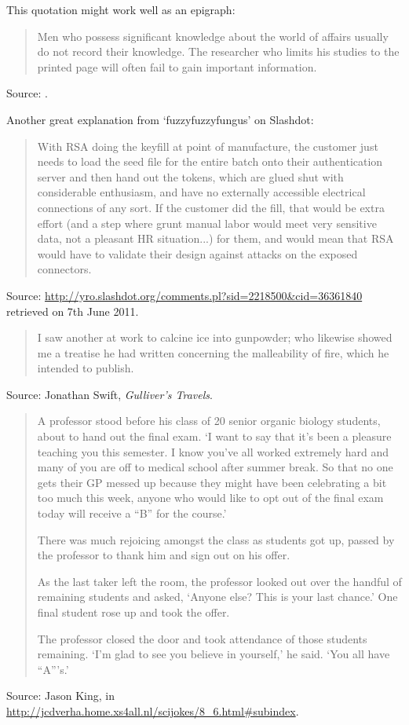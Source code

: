 \documentclass[a4paper]{article}
\begin{document}
This quotation might work well as an epigraph:
\begin{quote}
Men who possess significant knowledge about the world of affairs
usually do not record their knowledge.  The researcher who limits
his studies to the printed page will often fail to gain important
information.
\end{quote}
Source: \citep[p.~ix]{Ginzberg1955}.
\medskip

Another great explanation from `fuzzyfuzzyfungus' on Slashdot:
\begin{quote}
	With RSA doing the keyfill at point of manufacture, the customer just needs to load the seed
file for the entire batch onto their authentication server and then hand out the tokens, which are
glued shut with considerable enthusiasm, and have no externally accessible electrical connections
of any sort. If the customer did the fill, that would be extra effort (and a step where grunt
manual labor would meet very sensitive data, not a pleasant HR situation...) for them, and would
mean that RSA would have to validate their design against attacks on the exposed connectors.
\end{quote}
Source: \url{http://yro.slashdot.org/comments.pl?sid=2218500&cid=36361840} retrieved on 7th June
2011.
\medskip

\begin{quote}
	I saw another at work to calcine ice into gunpowder; who likewise
	showed me a treatise he had written concerning the malleability
	of fire, which he intended to publish.
\end{quote}
Source: Jonathan Swift, \emph{Gulliver's Travels}.
\medskip

\begin{quote}
	A professor stood before his class of 20 senior organic biology
	students, about to hand out the final exam. `I want to say that
	it's been a pleasure teaching you this semester. I know you've
	all worked extremely hard and many of you are off to medical
	school after summer break. So that no one gets their GP messed
	up because they might have been celebrating a bit too much this
	week, anyone who would like to opt out of the final exam today
	will receive a ``B'' for the course.'

	There was much rejoicing amongst the class as students got up,
	passed by the professor to thank him and sign out on his offer.

	As the last taker left the room, the professor looked out over
	the handful of remaining students and asked, `Anyone else? This is
	your last chance.' One final student rose up and took the offer.

	The professor closed the door and took attendance of those
	students remaining. `I'm glad to see you believe in yourself,'
	he said. `You all have ``A'''s.'
\end{quote}
Source: Jason King, in \url{http://jcdverha.home.xs4all.nl/scijokes/8_6.html#subindex}.
\medskip
\end{document}

